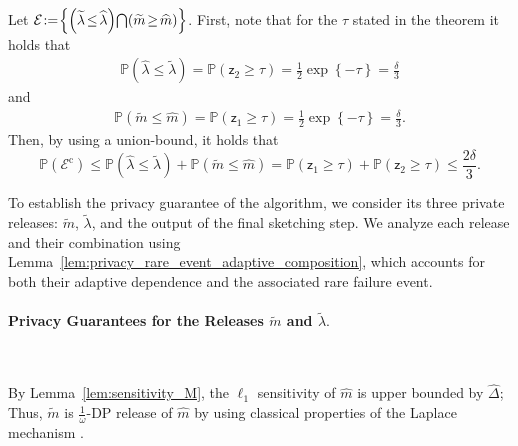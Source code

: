\documentclass[11pt]{article}
\theoremstyle{definition}
\theoremstyle{plain}
\providecommand{\lemmaref}[1]{Lemma~\ref{#1}}
\begin{document}
Let $\mathcal{E} \hspace{-0.2em}:=\hspace{-0.2em} \left\{\left(\widetilde{\lambda} \hspace{-0.15em}\leq\hspace{-0.15em} \widehat{\lambda}\right)\hspace{-0.15em}\bigcap\hspace{-0.15em} \left(\widetilde{m} \hspace{-0.15em}\geq\hspace{-0.15em} \widehat{m}\right)\right\}$. First, note that for the $\tau$ stated in the theorem it holds that 
\begin{align}
    \mathbb{P}\left(\widehat{\lambda} \leq \widetilde{\lambda}\right) = \mathbb{P}\left(\mathsf{z}_2 \geq \tau\right) = \frac{1}{2}\exp\left\{-\tau\right\} = \frac{\delta}{3}
\end{align}
and 
\begin{align}
    \mathbb{P}\left(\widetilde{m} \leq \widehat{m}\right) = \mathbb{P}\left(\mathsf{z}_1 \geq \tau\right) = \frac{1}{2}\exp\left\{-\tau\right\} = \frac{\delta}{3}.
\end{align}
Then, by using a union-bound, it holds that
\begin{equation}
    \label{eq:prob_bound_m_tilde}
    \mathbb{P}\left(\mathcal{E}^{\mathrm{c}}\right) \leq \mathbb{P}\left(\widehat{\lambda} \leq \widetilde{\lambda}\right) + \mathbb{P}\left(\widetilde{m}\leq \widehat{m}\right) = \mathbb{P}\left(\mathsf{z}_1 \geq \tau \right) + \mathbb{P}\left(\mathsf{z}_2 \geq \tau \right) \leq \frac{2\delta}{3}.
\end{equation}

To establish the privacy guarantee of the algorithm, we consider its three private releases: $\widetilde{m}$, $\widetilde{\lambda}$, and the output of the final sketching step. We analyze each release and their combination using \lemmaref{lem:privacy_rare_event_adaptive_composition}, which accounts for both their adaptive dependence and the associated rare failure event.

\paragraph{Privacy Guarantees for the Releases $\widetilde{m}$ and $\widetilde{\lambda}.$} \ 

By \lemmaref{lem:sensitivity_M}, the $\ell_1$ sensitivity of $\widehat{m}$ is upper bounded by $\widehat{\Delta}$; Thus, $\widetilde{m}$ is $\frac{1}{\omega}$-DP release of $\widehat{m}$ by using classical properties of the Laplace mechanism \citep[Section.~3.3]{Dwork_AlgFoundationd_DP}.
\end{document}
